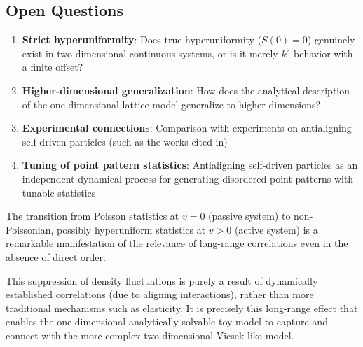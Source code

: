 \subsection{Open Questions}

\begin{enumerate}
    \item \textbf{Strict hyperuniformity}: Does true hyperuniformity ($S(0) = 0$) genuinely exist in two-dimensional continuous systems, or is it merely $k^2$ behavior with a finite offset?
    \item \textbf{Higher-dimensional generalization}: How does the analytical description of the one-dimensional lattice model generalize to higher dimensions?
    \item \textbf{Experimental connections}: Comparison with experiments on antialigning self-driven particles (such as the works cited in\cite{boltz2025})
    \item \textbf{Tuning of point pattern statistics}: Antialigning self-driven particles as an independent dynamical process for generating disordered point patterns with tunable statistics
\end{enumerate}

\begin{notebox}
The transition from Poisson statistics at $v = 0$ (passive system) to non-Poissonian, possibly hyperuniform statistics at $v > 0$ (active system) is a remarkable manifestation of the relevance of long-range correlations even in the absence of direct order.

This suppression of density fluctuations is purely a result of dynamically established correlations (due to aligning interactions), rather than more traditional mechanisms such as elasticity. It is precisely this long-range effect that enables the one-dimensional analytically solvable toy model to capture and connect with the more complex two-dimensional Vicsek-like model.
\end{notebox}
